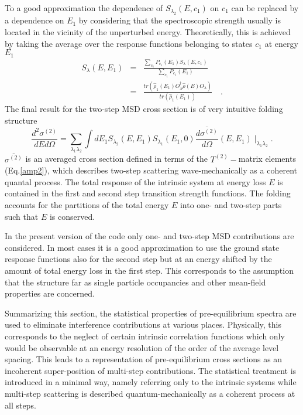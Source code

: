 \documentclass[twocolumn,amsmath,amssymb,10pt,groupedaddress,a4paper]{revtex4}
\begin{document}
To a good approximation the dependence of $S_{\lambda_{2}}(E,c_{1})$
on $c_{1}$ can be replaced by a dependence on $E_{1}$ by considering
that the spectroscopic strength usually is located in the vicinity
of the unperturbed energy. Theoretically, this is achieved by taking
the average over the response functions belonging to states $c_{1}$
at energy $E_{1}$
\begin{eqnarray}
S_{\lambda}(E,E_{1}) & = & \frac{\sum_{c_{1}}{P_{c_{1}}(E_{1})S_{\lambda}(E,c_{1})}}{\sum_{c_{1}}{P_{c_{1}}(E_{1})}}\nonumber \\
 & = & \frac{tr(\hat{\rho}_{1}(E_{1})O_{\lambda}^{\dag}\hat{\rho}(E)O_{\lambda})}{tr(\hat{\rho}_{1}(E_{1}))}\quad.\label{slave}
\end{eqnarray}
\noindent The final result for the two-step MSD cross section is
of very intuitive folding structure
\begin{equation}
\frac{d^{2}\sigma^{(2)}}{dEd\Omega}=\sum_{\lambda_{1}\lambda_{2}}{\int dE_{1}S_{\lambda_{2}}(E,E_{1})S_{\lambda_{1}}(E_{1},0)\overline{\frac{d\sigma^{(2)}}{d\Omega}}(E,E_{1})\mid_{\lambda_{1}\lambda_{2}}}.
\label{sigma2}
\end{equation}
\noindent $\overline{\sigma^{(2)}}$ is an averaged cross section defined in
terms of the $T^{(2)}-$matrix elements (Eq.\ref{amp2}), which describes
two-step scattering wave-mechanically as a coherent quantal process.
The total response of the intrinsic system at energy loss $E$ is
contained in the first and second step transition strength functions.
The folding accounts for the partitions of the total energy $E$ into
one- and two-step parts such that $E$ is conserved.

In the present version of the code only one- and two-step MSD
contributions are considered. In most cases it is a good approximation
to use the ground state response functions also for the second step
but at an energy shifted by the amount of total energy loss in the
first step. This corresponds to the assumption that the structure
far as single particle occupancies and other mean-field properties
are concerned.

Summarizing this section, the statistical properties of pre-equilibrium
spectra are used to eliminate interference contributions at various
places. Physically, this corresponds to the neglect of certain intrinsic
correlation functions which only would be observable at an energy
resolution of the order of the average level spacing. This leads to
a representation of pre-equilibrium cross sections as an incoherent
super-position of multi-step contributions. The statistical treatment
is introduced in a minimal way, namely referring only to the intrinsic
systems while multi-step scattering is described quantum-mechanically
as a coherent process at all steps.
\end{document}
